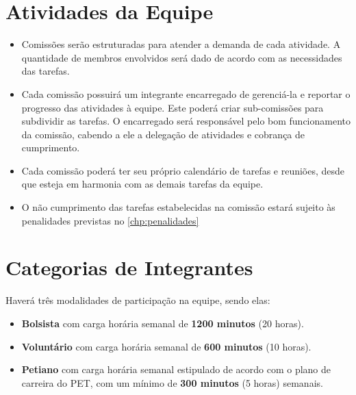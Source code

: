 \chapter{Atividades da Equipe}
\label{chp:atividades}

\begin{itemize}
\item Comissões serão estruturadas para atender a demanda de cada atividade. A quantidade de membros envolvidos será dado de acordo com as necessidades das tarefas.

\item Cada comissão possuirá um integrante encarregado de gerenciá-la e reportar o progresso das atividades à equipe. Este poderá criar sub-comissões para subdividir as tarefas. O encarregado será responsável pelo bom funcionamento da comissão, cabendo a ele a delegação de atividades e cobrança de cumprimento.

\item Cada comissão poderá ter seu próprio calendário de tarefas e reuniões, desde que esteja em harmonia com as demais tarefas da equipe.

\item O não cumprimento das tarefas estabelecidas na comissão estará sujeito às penalidades previstas no \autoref{chp:penalidades}
\end{itemize}


\chapter{Categorias de Integrantes}
\label{chp:categorias}

Haverá três modalidades de participação na equipe, sendo elas:

\begin{itemize}
\item[] \textbf{Bolsista} com carga horária semanal de \textbf{1200 minutos} (20 horas).
\item[] \textbf{Voluntário} com carga horária semanal de \textbf{600 minutos} (10 horas).
\item[] \textbf{Petiano} com carga horária semanal estipulado de acordo com o plano de carreira do PET, com um mínimo de \textbf{300 minutos} (5 horas) semanais.
\end{itemize}

